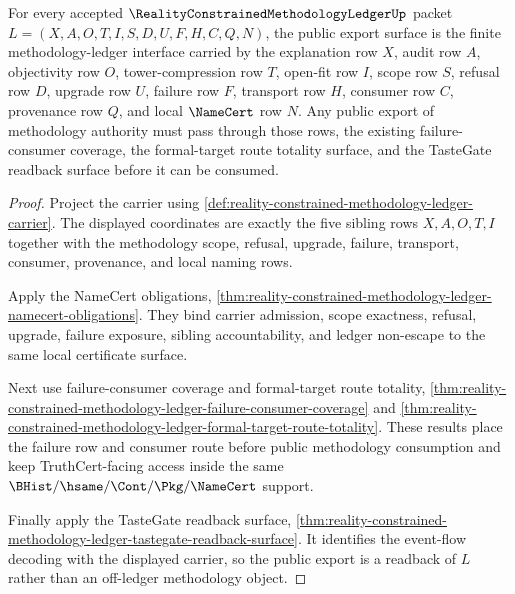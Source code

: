 \begin{theorem}
\label{thm:reality-constrained-methodology-ledger-public-export-readiness}
For every accepted $\RealityConstrainedMethodologyLedgerUp$ packet
$L=(X,A,O,T,I,S,D,U,F,H,C,Q,N)$, the public export surface is the finite
methodology-ledger interface carried by the explanation row $X$, audit row
$A$, objectivity row $O$, tower-compression row $T$, open-fit row $I$, scope
row $S$, refusal row $D$, upgrade row $U$, failure row $F$, transport row $H$,
consumer row $C$, provenance row $Q$, and local $\NameCert$ row $N$. Any public
export of methodology authority must pass through those rows, the existing
failure-consumer coverage, the formal-target route totality surface, and the
TasteGate readback surface before it can be consumed.
\end{theorem}
\begin{proof}
Project the carrier using
\autoref{def:reality-constrained-methodology-ledger-carrier}. The displayed
coordinates are exactly the five sibling rows $X,A,O,T,I$ together with the
methodology scope, refusal, upgrade, failure, transport, consumer, provenance,
and local naming rows.

Apply the NameCert obligations,
\autoref{thm:reality-constrained-methodology-ledger-namecert-obligations}.
They bind carrier admission, scope exactness, refusal, upgrade, failure
exposure, sibling accountability, and ledger non-escape to the same local
certificate surface.

Next use failure-consumer coverage and formal-target route totality,
\autoref{thm:reality-constrained-methodology-ledger-failure-consumer-coverage}
and
\autoref{thm:reality-constrained-methodology-ledger-formal-target-route-totality}.
These results place the failure row and consumer route before public
methodology consumption and keep TruthCert-facing access inside the same
$\BHist/\hsame/\Cont/\Pkg/\NameCert$ support.

Finally apply the TasteGate readback surface,
\autoref{thm:reality-constrained-methodology-ledger-tastegate-readback-surface}.
It identifies the event-flow decoding with the displayed carrier, so the
public export is a readback of $L$ rather than an off-ledger methodology object.
\end{proof}

